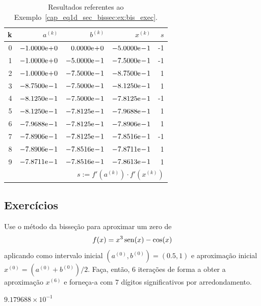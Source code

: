 \begin{ex}
\begin{table}[H]
  \centering
  \caption{Resultados referentes ao Exemplo~\ref{cap_eq1d_sec_bissec:ex:bis_exec}.}
  \begin{tabular}{r|rr|r|r}
    k & $a^{(k)}$ & $b^{(k)}$ & $x^{(k)}$ & $s$\\\hline
    0 & $-1.0000\mathrm{e}\!+\!0$ & $0.0000\mathrm{e}\!+\!0$ & $-5.0000\mathrm{e}\!-\!1$ & -1 \\
    1 & $-1.0000\mathrm{e}\!+\!0$ & $-5.0000\mathrm{e}\!-\!1$ & $-7.5000\mathrm{e}\!-\!1$ & -1 \\
    2 & $-1.0000\mathrm{e}\!+\!0$ & $-7.5000\mathrm{e}\!-\!1$ & $-8.7500\mathrm{e}\!-\!1$ & 1 \\
    3 & $-8.7500\mathrm{e}\!-\!1$ & $-7.5000\mathrm{e}\!-\!1$ & $-8.1250\mathrm{e}\!-\!1$ &  1 \\
    4 & $-8.1250\mathrm{e}\!-\!1$ & $-7.5000\mathrm{e}\!-\!1$ & $-7.8125\mathrm{e}\!-\!1$ & -1 \\
    5 & $-8.1250\mathrm{e}\!-\!1$ & $-7.8125\mathrm{e}\!-\!1$ & $-7.9688\mathrm{e}\!-\!1$ & 1 \\
    6 & $-7.9688\mathrm{e}\!-\!1$ & $-7.8125\mathrm{e}\!-\!1$ & $-7.8906\mathrm{e}\!-\!1$ & 1 \\
    7 & $-7.8906\mathrm{e}\!-\!1$ & $-7.8125\mathrm{e}\!-\!1$ & $-7.8516\mathrm{e}\!-\!1$ & -1 \\
    8 & $-7.8906\mathrm{e}\!-\!1$ & $-7.8516\mathrm{e}\!-\!1$ & $-7.8711\mathrm{e}\!-\!1$ & 1 \\
    9 & $-7.8711\mathrm{e}\!-\!1$ & $-7.8516\mathrm{e}\!-\!1$ & $-7.8613\mathrm{e}\!-\!1$ & 1 \\\hline
    \multicolumn{5}{r}{\small $s := f'(a^{(k)})\cdot f'(x^{(k)})$}
  \end{tabular}
  \label{cap_eq1d_sec_bissec:tab:bis_multpar}
\end{table}
\end{ex}

\subsection{Exercícios}

\begin{exer}
  Use o método da bisseção para aproximar um zero de
  \begin{equation}
    f(x)=x^3\operatorname{sen}(x)-\cos(x)
\end{equation}
aplicando como intervalo inicial $(a^{(0)}, b^{(0)}) = (0.5,  1)$ e aproximação inicial $x^{(0)}=(a^{(0)}+b^{(0)})/2$. Faça, então, $6$ iterações de forma a obter a aproximação $x^{(6)}$ e forneça-a com $7$ dígitos significativos por arredondamento.
\end{exer}
\begin{resp}
  $9.179688\times 10^{-1}$
\end{resp}

